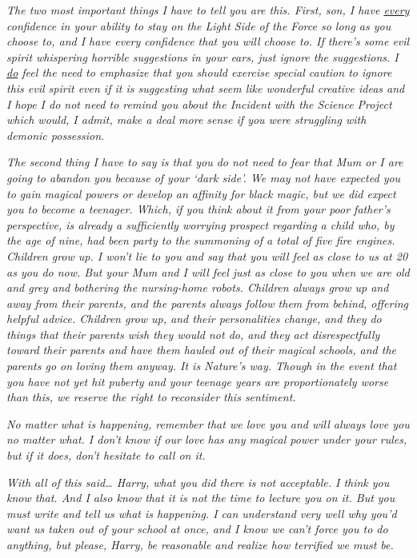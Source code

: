 \emph{The two most important things I have to tell you are this. First, son, I 
have \underline{every} confidence in your ability to stay on the Light Side of 
the Force so long as you choose to, and I have every confidence that you will 
choose to. If there's some evil spirit whispering horrible suggestions in your 
ears, just ignore the suggestions. I \underline{do} feel the need to emphasize 
that you should exercise special caution to ignore this evil spirit even if it 
is suggesting what seem like wonderful creative ideas and I hope I do not need 
to remind you about the Incident with the Science Project which would, I admit, 
make a deal more sense if you were struggling with demonic possession.}

\emph{The second thing I have to say is that you do not need to fear that Mum 
or I are going to abandon you because of your `dark side'. We may not have 
expected you to gain magical powers or develop an affinity for black magic, but 
we did expect you to become a teenager. Which, if you think about it from your 
poor father's perspective, is already a sufficiently worrying prospect 
regarding a child who, by the age of nine, had been party to the summoning of a 
total of five fire engines. Children grow up. I won't lie to you and say that 
you will feel as close to us at 20 as you do now. But your Mum and I will feel 
just as close to you when we are old and grey and bothering the nursing-home 
robots. Children always grow up and away from their parents, and the parents 
always follow them from behind, offering helpful advice. Children grow up, and 
their personalities change, and they do things that their parents wish they 
would not do, and they act disrespectfully toward their parents and have them 
hauled out of their magical schools, and the parents go on loving them anyway. 
It is Nature's way. Though in the event that you have not yet hit puberty and 
your teenage years are proportionately worse than this, we reserve the right to 
reconsider this sentiment.}

\emph{No matter what is happening, remember that we love you and will always 
love you no matter what. I don't know if our love has any magical power under 
your rules, but if it does, don't hesitate to call on it.}

\emph{With all of this said{\ldots} Harry, what you did there is not 
acceptable. I think you know that. And I also know that it is not the time to 
lecture you on it. But you must write and tell us what is happening. I can 
understand very well why you'd want us taken out of your school at once, and I 
know we can't force you to do anything, but please, Harry, be reasonable and 
realize how terrified we must be.}

